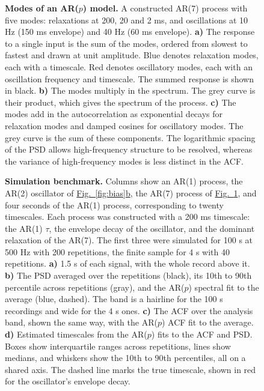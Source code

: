 \documentclass[pdflatex,lineno,sn-nature]{sn-jnl}
\newcommand{\figpanel}[3][]{\hyperref[#2]{Fig.~#1\ref*{#2}#3}}
\theoremstyle{thmstyleone}
\theoremstyle{thmstyletwo}
\theoremstyle{thmstylethree}
\begin{document}
\begin{figure}[htbp]
\centering

\caption{\textbf{Modes of an AR($p$) model.} A constructed AR(7) process with five modes: relaxations at 200, 20 and 2 ms, and oscillations at 10 Hz (150 ms envelope) and 40 Hz (60 ms envelope). \textbf{a)} The response to a single input is the sum of the modes, ordered from slowest to fastest and drawn at unit amplitude. Blue denotes relaxation modes, each with a timescale. Red denotes oscillatory modes, each with an oscillation frequency and timescale. The summed response is shown in black. \textbf{b)} The modes multiply in the spectrum. The grey curve is their product, which gives the spectrum of the process. \textbf{c)} The modes add in the autocorrelation as exponential decays for relaxation modes and damped cosines for oscillatory modes. The grey curve is the sum of these components. The logarithmic spacing of the PSD allows high-frequency structure to be resolved, whereas the variance of high-frequency modes is less distinct in the ACF.}
\label{fig:modes}
\end{figure}

\begin{figure}[htbp]
\centering

\caption{\textbf{Simulation benchmark.} Columns show an AR(1) process, the AR(2) oscillator of \figpanel{fig:bias}{b}, the AR(7) process of \figpanel{fig:modes}{}, and four seconds of the AR(1) process, corresponding to twenty timescales. Each process was constructed with a 200 ms timescale: the AR(1) $\tau$, the envelope decay of the oscillator, and the dominant relaxation of the AR(7). The first three were simulated for 100 s at 500 Hz with 200 repetitions, the finite sample for 4 s with 40 repetitions. \textbf{a)} 1.5 s of each signal, with the whole record above it. \textbf{b)} The PSD averaged over the repetitions (black), its 10th to 90th percentile across repetitions (gray), and the AR($p$) spectral fit to the average (blue, dashed). The band is a hairline for the 100 s recordings and wide for the 4 s ones. \textbf{c)} The ACF over the analysis band, shown the same way, with the AR($p$) ACF fit to the average. \textbf{d)} Estimated timescales from the AR($p$) fits to the ACF and PSD. Boxes show interquartile ranges across repetitions, lines show medians, and whiskers show the 10th to 90th percentiles, all on a shared axis. The dashed line marks the true timescale, shown in red for the oscillator's envelope decay.}
\label{fig:benchmark}
\end{figure}
\end{document}

